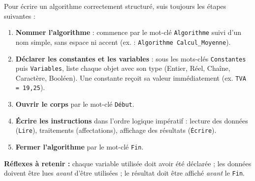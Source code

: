 \documentclass[11pt]{article}
\newcommand{\cle}[1]{{\popxbold\color{popdark}#1}}
\begin{document}
\begin{methode}
Pour écrire un algorithme correctement structuré, suis toujours les étapes suivantes :
\begin{enumerate}
  \item \textbf{Nommer l'algorithme} : commence par le mot-clé \texttt{Algorithme} suivi d'un nom simple, sans espace ni accent (ex. : \texttt{Algorithme Calcul\_Moyenne}).
  \item \textbf{Déclarer les constantes et les variables} : sous les mots-clés \texttt{Constantes} puis \texttt{Variables}, liste chaque objet avec son type (\cle{Entier}, \cle{Réel}, \cle{Chaîne}, \cle{Caractère}, \cle{Booléen}). Une constante reçoit sa valeur immédiatement (ex. \texttt{TVA = 19,25}).
  \item \textbf{Ouvrir le corps} par le mot-clé \texttt{Début}.
  \item \textbf{Écrire les instructions} dans l'ordre logique impératif : lecture des données (\texttt{Lire}), traitements (affectations), affichage des résultats (\texttt{Écrire}).
  \item \textbf{Fermer l'algorithme} par le mot-clé \texttt{Fin}.
\end{enumerate}
\textbf{Réflexes à retenir :} chaque variable utilisée doit avoir été déclarée ; les données doivent être lues \emph{avant} d'être utilisées ; le résultat doit être affiché \emph{avant} le \texttt{Fin}.
\end{methode}
\end{document}
